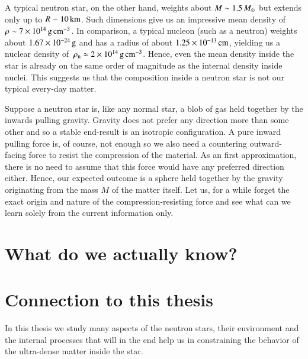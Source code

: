 A typical neutron star, on the other hand, weights about $M \sim 1.5\, M_{\odot}$ but extends only up to $R \sim 10\, \mathrm{km}$.
Such dimensions give us an impressive mean density of $\rho \sim 7 \times 10^{14} \, \mathrm{g}\,\mathrm{cm}^{-3} $.
In comparison, a typical nucleon (such as a neutron) weights about $1.67 \times 10^{-24} \, \mathrm{g}$ and has a radius of about $1.25 \times 10^{-13} \, \mathrm{cm}$, yielding us a nuclear density of $\, \rho_{\mathrm{n}}  \approx 2 \times 10^{14} \, \mathrm{g}\,\mathrm{cm}^{-3} $.
Hence, even the mean density inside the star is already on the same order of magnitude as the internal density inside nuclei.
This suggests us that the composition inside a neutron star is not our typical every-day matter.


Suppose a neutron star is, like any normal star, a blob of gas held together by the inwards pulling gravity.
Gravity does not prefer any direction more than some other and so a stable end-result is an isotropic configuration.
A pure inward pulling force is, of course, not enough so we also need a countering outward-facing force to resist the compression of the material.
As an first approximation, there is no need to assume that this force would have any preferred direction either.
Hence, our expected outcome is a sphere held together by the gravity originating from the mass $M$ of the matter itself.
Let us, for a while forget the exact origin and nature of the compression-resisting force and see what can we learn solely from the current information only.

\section{What do we actually know?}


%
%


\section{Connection to this thesis}
In this thesis we study many aspects of the neutron stars, their environment and the internal processes that will in the end help us in constraining the behavior of the ultra-dense matter inside the star.
